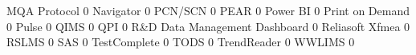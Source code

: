\documentclass{article}
\begin{document}
\begin{Schunk}
\begin{Soutput}
  MQA Protocol                                                                  0
  Navigator                                                                     0
  PCN/SCN                                                                       0
  PEAR                                                                          0
  Power BI                                                                      0
  Print on Demand                                                               0
  Pulse                                                                         0
  QIMS                                                                          0
  QPI                                                                           0
  R&D Data Management Dashboard                                                 0
  Reliasoft Xfmea                                                               0
  RSLMS                                                                         0
  SAS                                                                           0
  TestComplete                                                                  0
  TODS                                                                          0
  TrendReader                                                                   0
  WWLIMS                                                                        0
                                                           

\end{Soutput}
\end{Schunk}
\end{document}
